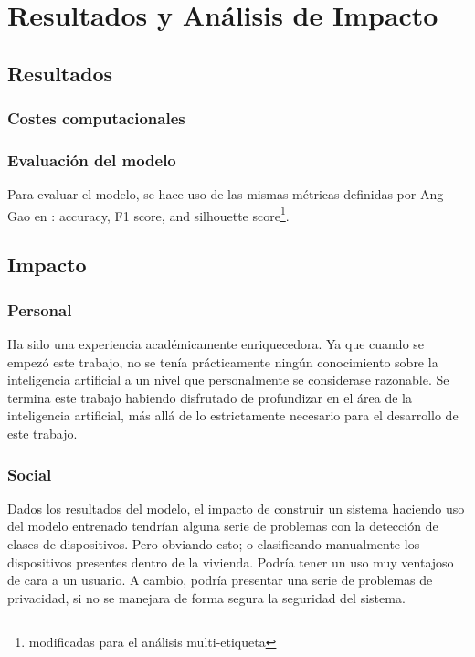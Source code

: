 \chapter{Resultados y Análisis de Impacto}

\section{Resultados}

\subsection{Costes computacionales}

\subsection{Evaluación del modelo}
Para evaluar el modelo, se hace uso de las mismas métricas definidas por Ang Gao en \autocite{GAO2023109443}: accuracy, F1 score, and silhouette score\footnote{modificadas para el análisis multi-etiqueta}.



\section{Impacto}
\subsection{Personal}
Ha sido una experiencia académicamente enriquecedora. Ya que cuando se empezó este trabajo, no se tenía prácticamente ningún conocimiento sobre la inteligencia artificial a un nivel que personalmente se considerase razonable. Se termina este trabajo habiendo disfrutado de profundizar en el área de la inteligencia artificial, más allá de lo estrictamente necesario para el desarrollo de este trabajo. 
\subsection{Social}
Dados los resultados del modelo, el impacto de construir un sistema haciendo uso del modelo entrenado tendrían alguna serie de problemas con la detección de clases de dispositivos. Pero obviando esto; o clasificando manualmente los dispositivos presentes dentro de la vivienda. Podría tener un uso muy ventajoso de cara a un usuario. 
A cambio, podría presentar una serie de problemas de privacidad, si no se manejara de forma segura la seguridad del sistema. 
